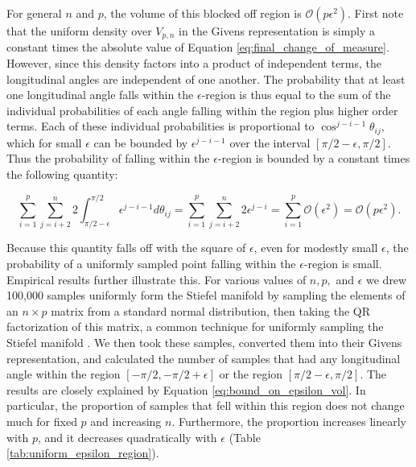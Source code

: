 \documentclass[ba]{imsart}
\numberwithin{equation}{section}
\theoremstyle{plain}
\begin{document}
\noindent For general $n$ and $p$, the volume of this blocked off region is $\mathcal{O}(p \epsilon^2)$. First note that the uniform density over $V_{p,n}$ in the Givens representation is simply a constant times the absolute value of Equation \ref{eq:final_change_of_measure}. However, since this density factors into a product of independent terms, the longitudinal angles are independent of one another. The probability that at least one longitudinal angle falls within the $\epsilon$-region is thus equal to the sum of the individual probabilities of each angle falling within the region plus higher order terms. Each of these individual probabilities is proportional to $\cos^{j-i-1} \theta_{ij}$, which for small $\epsilon$ can be bounded by $\epsilon^{j-i-1}$ over the interval $[\pi/2 - \epsilon, \pi/2]$. Thus the probability of falling within the $\epsilon$-region is bounded by a constant times the following quantity:

\begin{equation}
\label{eq:bound_on_epsilon_vol}
\sum_{i=1}^p \sum_{j=i+2}^n 2 \int_{\pi/2-\epsilon}^{\pi/2} \epsilon^{j-i-1} d\theta_{ij} = \sum_{i=1}^p \sum_{j=i+2}^n 2 \epsilon^{j-i} = \sum_{i=1}^p \mathcal{O}(\epsilon^2) = \mathcal{O}(p \epsilon^2).
\end{equation}

\noindent Because this quantity falls off with the square of $\epsilon$, even for modestly small $\epsilon$, the probability of a uniformly sampled point falling within the $\epsilon$-region is small. Empirical results further illustrate this. For various values of $n, p,$ and $\epsilon$ we drew 100,000 samples uniformly form the Stiefel manifold by sampling the elements of an $n \times p$ matrix from a standard normal distribution, then taking the QR factorization of this matrix, a common technique for uniformly sampling the Stiefel manifold \citep{muirhead2009aspects}. We then took these samples, converted them into their Givens representation, and calculated the number of samples that had any longitudinal angle within the region $[-\pi/2, -\pi/2+\epsilon]$ or the region $[\pi/2-\epsilon, \pi/2]$. The results are closely explained by Equation \ref{eq:bound_on_epsilon_vol}. In particular, the proportion of samples that fell within this region does not change much for fixed $p$ and increasing $n$. Furthermore, the proportion increases linearly with $p$, and it decreases quadratically with $\epsilon$ (Table \ref{tab:uniform_epsilon_region}).  
\end{document}
